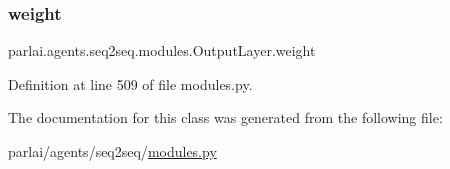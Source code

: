\subsubsection{\texorpdfstring{weight}{weight}}
{\footnotesize\ttfamily parlai.\+agents.\+seq2seq.\+modules.\+Output\+Layer.\+weight}



Definition at line 509 of file modules.\+py.



The documentation for this class was generated from the following file\+:\begin{DoxyCompactItemize}
\item 
parlai/agents/seq2seq/\hyperlink{parlai_2agents_2seq2seq_2modules_8py}{modules.\+py}\end{DoxyCompactItemize}
